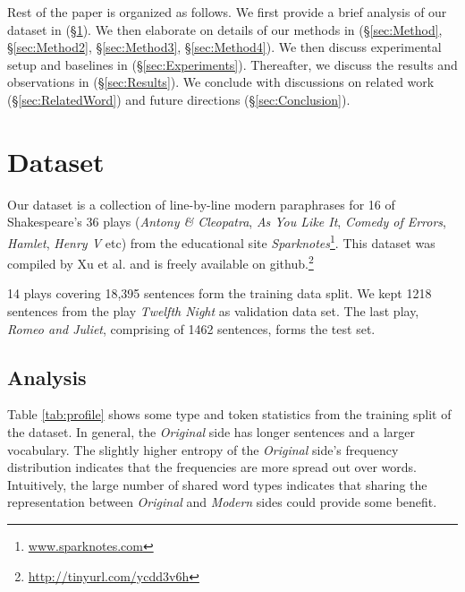 Rest of the paper is organized as follows. We first provide a brief analysis of our dataset in  (\S\ref{sec:Dataset}). We then elaborate on details of our methods in  (\S\ref{sec:Method}, \S\ref{sec:Method2}, \S\ref{sec:Method3}, \S\ref{sec:Method4}). We then discuss experimental setup and baselines in (\S\ref{sec:Experiments}). Thereafter, we discuss the results and observations in (\S \ref{sec:Results}). We conclude with discussions on related work (\S \ref{sec:RelatedWord}) and future directions (\S \ref{sec:Conclusion}).



\section{Dataset} \label{sec:Dataset}%

Our dataset is a collection of line-by-line modern paraphrases for 16 of Shakespeare's 36 plays (\textit{Antony \& Cleopatra}, \textit{As You Like It}, \textit{Comedy of Errors}, \textit{Hamlet}, \textit{Henry V} etc) from the educational site \textit{Sparknotes}\footnote{\url{www.sparknotes.com}}.
This dataset was compiled by Xu et al.  and is freely available on github.\footnote{ \url{http://tinyurl.com/ycdd3v6h}}

14 plays covering 18,395 sentences form the training data split. We kept 1218 sentences from the play \emph{Twelfth Night} as validation data set. The last play, \emph{Romeo and Juliet}, comprising of 1462 sentences, forms the test set.

\subsection{Analysis}
Table \ref{tab:profile} shows some type and token statistics from the training split of the dataset. In general, the \textit{Original} side has longer sentences and a larger vocabulary. The slightly higher entropy of the \textit{Original} side's frequency distribution indicates that the frequencies are more spread out over words. Intuitively, the large number of shared word types indicates that sharing the representation between \textit{Original} and \textit{Modern} sides could provide some benefit.

